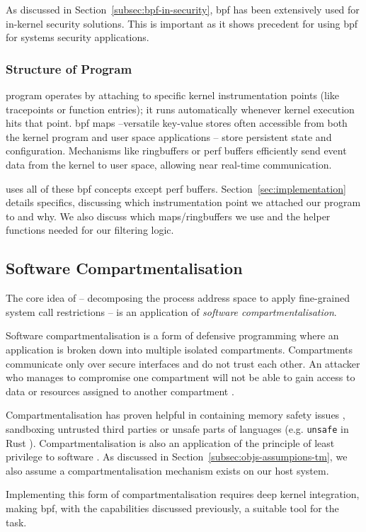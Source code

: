 As discussed in Section~\ref{subsec:bpf-in-security}, \ac{bpf} has been
extensively used for in-kernel security solutions. This is important as it shows
precedent for using \ac{bpf} for systems security applications.

\subsubsection{Structure of  Program}

 program operates by attaching to specific kernel instrumentation
points (like tracepoints or function entries); it runs automatically
whenever kernel execution hits that point. \ac{bpf} maps --versatile key-value stores often accessible from both
the kernel program and user space applications -- store persistent state and configuration. Mechanisms like ringbuffers or perf buffers efficiently send
event data from the kernel to user space, allowing near real-time communication.

\af uses all of these \ac{bpf} concepts except perf buffers.
Section~\ref{sec:implementation} details specifics,
discussing which instrumentation point we attached our program to and why. We
also discuss which maps/ringbuffers we use and the helper functions needed for
our filtering logic.

\subsection{Software Compartmentalisation}

The core idea of \af -- decomposing the process address space to apply 
fine-grained system call restrictions -- is an application of \textit{software
compartmentalisation}.

Software compartmentalisation is a form of defensive programming where an application
is broken down into multiple isolated compartments. Compartments
communicate only over secure interfaces and do not trust each other. An
attacker who manages to compromise one compartment will not be able to gain
access to data or resources assigned to another compartment \cite{SOK}.

Compartmentalisation has proven helpful in containing memory safety issues
\cite{CONFFUZZ}, sandboxing untrusted third parties \cite{ANDROID_SOK} or
unsafe parts of languages \cite{MPK} (e.g. \texttt{unsafe} in Rust 
\cite{rustbook_unsafe}). Compartmentalisation is also an application of the
principle of least privilege to software \cite{PRIVMAN}. As discussed in 
Section~\ref{subsec:objs-assumpions-tm}, we also assume a compartmentalisation
mechanism exists on our host system.

Implementing this form of compartmentalisation requires deep kernel
integration, making \ac{bpf}, with the capabilities discussed previously, a 
suitable tool for the task.  
